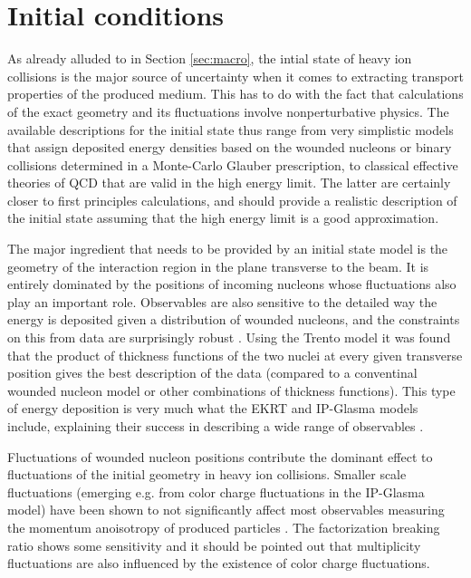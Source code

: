 \section{Initial conditions} \label{sec:initialstate}
As already alluded to in Section \ref{sec:macro}, the intial state of heavy ion collisions is the major source of uncertainty when it comes to extracting transport properties of the produced medium. This has to do with the fact that calculations of the exact geometry and its fluctuations involve nonperturbative physics. The available descriptions for the initial state thus range from very simplistic models that assign deposited energy densities based on the wounded nucleons or binary collisions determined in a Monte-Carlo Glauber prescription, to classical effective theories of QCD that are valid in the high energy limit. The latter are certainly closer to first principles calculations, and should provide a realistic description of the initial state assuming that the high energy limit is a good approximation.

The major ingredient that needs to be provided by an initial state model is the geometry of the interaction region in the plane transverse to the beam. It is entirely dominated by the positions of incoming nucleons whose fluctuations also play an important role. Observables are also sensitive to the detailed way the energy is deposited given a distribution of wounded nucleons, and the constraints on this from data are surprisingly robust \cite{Moreland:2018gsh}. Using the Trento model it was found that the product of thickness functions of the two nuclei at every given transverse position gives the best description of the data (compared to a conventinal wounded nucleon model or other combinations of thickness functions). This type of energy deposition is very much what the EKRT \cite{Niemi:2015qia} and IP-Glasma \cite{Schenke:2012wb,Schenke:2012fw} models include, explaining their success in describing a wide range of observables \cite{Niemi:2015qia,Gale:2012rq}.

Fluctuations of wounded nucleon positions contribute the dominant effect to fluctuations of the initial geometry in heavy ion collisions. Smaller scale fluctuations (emerging e.g. from color charge fluctuations in the IP-Glasma model) have been shown to not significantly affect most observables measuring the momentum anoisotropy of produced particles \cite{Gardim:2017ruc}. The factorization breaking ratio shows some sensitivity and it should be pointed out that multiplicity fluctuations are also influenced by the existence of color charge fluctuations.


